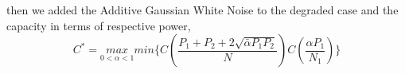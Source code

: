 \documentclass[preview]{standalone}
\begin{document}
\begin{center}
then we added the Additive Gaussian White Noise to the degraded case and the capacity in terms of respective power, \[C^{*}= \underset{0<\alpha<1}{max}min\{C(\frac{P_1+P_2+2\sqrt{\bar{\alpha}P_1P_2}}{N})C(\frac{\alpha P_1}{N_1})\}\]
\end{center}
\end{document}
